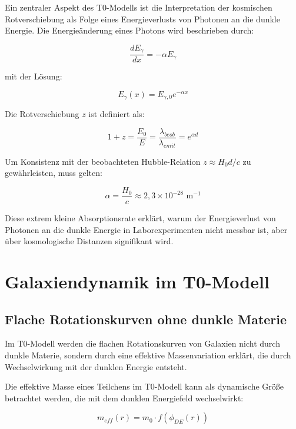 \documentclass[a4paper,12pt]{article}
\begin{document}
	Ein zentraler Aspekt des T0-Modells ist die Interpretation der kosmischen Rotverschiebung als Folge eines Energieverlusts von Photonen an die dunkle Energie. Die Energieänderung eines Photons wird beschrieben durch:
	
	\begin{equation}
		\frac{dE_{\gamma}}{dx} = -\alpha E_{\gamma}
	\end{equation}
	
	mit der Lösung:
	
	\begin{equation}
		E_{\gamma}(x) = E_{\gamma,0} e^{-\alpha x}
	\end{equation}
	
	Die Rotverschiebung $z$ ist definiert als:
	
	\begin{equation}
		1 + z = \frac{E_0}{E} = \frac{\lambda_{beob}}{\lambda_{emit}} = e^{\alpha d}
	\end{equation}
	
	Um Konsistenz mit der beobachteten Hubble-Relation $z \approx H_0 d/c$ zu gewährleisten, muss gelten:
	
	\begin{equation}
		\alpha = \frac{H_0}{c} \approx 2,3 \times 10^{-28} \text{ m}^{-1}
	\end{equation}
	
	Diese extrem kleine Absorptionsrate erklärt, warum der Energieverlust von Photonen an die dunkle Energie in Laborexperimenten nicht messbar ist, aber über kosmologische Distanzen signifikant wird.
	
	\section{Galaxiendynamik im T0-Modell}
	
	\subsection{Flache Rotationskurven ohne dunkle Materie}
	
	Im T0-Modell werden die flachen Rotationskurven von Galaxien nicht durch dunkle Materie, sondern durch eine effektive Massenvariation erklärt, die durch Wechselwirkung mit der dunklen Energie entsteht. 
	
	Die effektive Masse eines Teilchens im T0-Modell kann als dynamische Größe betrachtet werden, die mit dem dunklen Energiefeld wechselwirkt:
	
	\begin{equation}
		m_{eff}(r) = m_0 \cdot f(\phi_{DE}(r))
	\end{equation}
	
\end{document}
